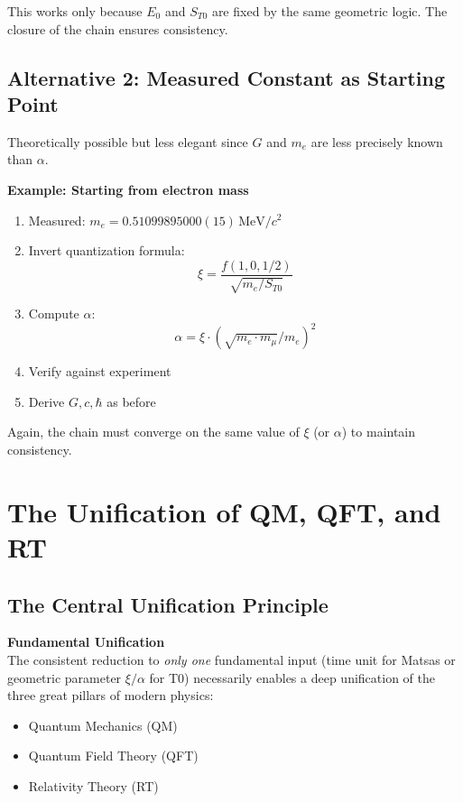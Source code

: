 	This works only because $E_0$ and $S_{T0}$ are fixed by the same geometric logic. The closure of the chain ensures consistency.
	
	\subsection{Alternative 2: Measured Constant as Starting Point}
	
	Theoretically possible but less elegant since $G$ and $m_e$ are less precisely known than $\alpha$.
	
	\textbf{Example: Starting from electron mass}
	
	\begin{enumerate}
		\item Measured: $m_e = 0.51099895000(15)\,\text{MeV}/c^2$
		
		\item Invert quantization formula:
		\[
		\xi = \frac{f(1,0,1/2)}{\sqrt{m_e / S_{T0}}}
		\]
		
		\item Compute $\alpha$:
		\[
		\alpha = \xi \cdot (\sqrt{m_e \cdot m_\mu} / m_e)^2
		\]
		
		\item Verify against experiment
		
		\item Derive $G, c, \hbar$ as before
	\end{enumerate}
	
	Again, the chain must converge on the same value of $\xi$ (or $\alpha$) to maintain consistency.
	
	\section{The Unification of QM, QFT, and RT}
	
	\subsection{The Central Unification Principle}
	
	\begin{keyresult}
		\textbf{Fundamental Unification}\\
		The consistent reduction to \emph{only one} fundamental input (time unit for Matsas or geometric parameter $\xi/\alpha$ for T0) necessarily enables a deep unification of the three great pillars of modern physics:
		\begin{itemize}
			\item Quantum Mechanics (QM)
			\item Quantum Field Theory (QFT)
			\item Relativity Theory (RT)
		\end{itemize}
	\end{keyresult}
	
